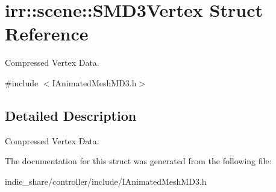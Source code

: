 \hypertarget{structirr_1_1scene_1_1SMD3Vertex}{}\section{irr\+:\+:scene\+:\+:S\+M\+D3\+Vertex Struct Reference}
\label{structirr_1_1scene_1_1SMD3Vertex}


Compressed Vertex Data.  




{\ttfamily \#include $<$I\+Animated\+Mesh\+M\+D3.\+h$>$}



\subsection{Detailed Description}
Compressed Vertex Data. 

The documentation for this struct was generated from the following file\+:\begin{DoxyCompactItemize}
\item 
indie\+\_\+share/controller/include/I\+Animated\+Mesh\+M\+D3.\+h\end{DoxyCompactItemize}
